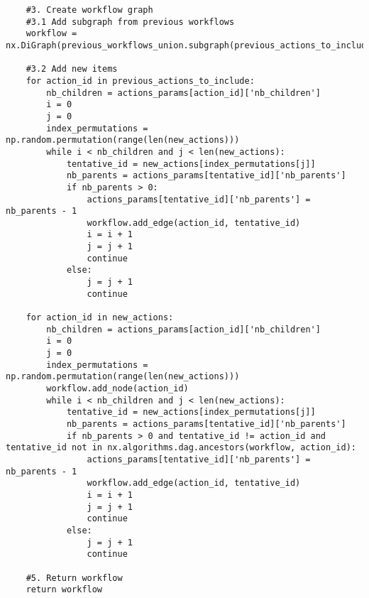 \begin{singlespace}
\begin{lstlisting}
    #3. Create workflow graph
    #3.1 Add subgraph from previous workflows
    workflow = nx.DiGraph(previous_workflows_union.subgraph(previous_actions_to_include))
    
    #3.2 Add new items
    for action_id in previous_actions_to_include:
        nb_children = actions_params[action_id]['nb_children']    
        i = 0
        j = 0
        index_permutations = np.random.permutation(range(len(new_actions)))
        while i < nb_children and j < len(new_actions):
            tentative_id = new_actions[index_permutations[j]]
            nb_parents = actions_params[tentative_id]['nb_parents']
            if nb_parents > 0:
                actions_params[tentative_id]['nb_parents'] = nb_parents - 1
                workflow.add_edge(action_id, tentative_id)
                i = i + 1
                j = j + 1
                continue
            else:
                j = j + 1
                continue
                
    for action_id in new_actions:
        nb_children = actions_params[action_id]['nb_children']
        i = 0
        j = 0
        index_permutations = np.random.permutation(range(len(new_actions)))
        workflow.add_node(action_id)
        while i < nb_children and j < len(new_actions):
            tentative_id = new_actions[index_permutations[j]]
            nb_parents = actions_params[tentative_id]['nb_parents']
            if nb_parents > 0 and tentative_id != action_id and tentative_id not in nx.algorithms.dag.ancestors(workflow, action_id):
                actions_params[tentative_id]['nb_parents'] = nb_parents - 1
                workflow.add_edge(action_id, tentative_id)
                i = i + 1
                j = j + 1
                continue
            else:
                j = j + 1
                continue
    
    #5. Return workflow
    return workflow

\end{lstlisting}
\end{singlespace}